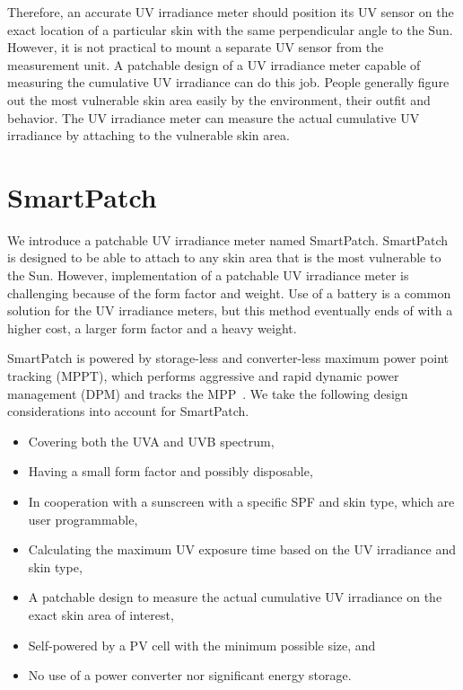 \documentclass[journal]{IEEEtran}
\begin{document}
Therefore, an accurate UV irradiance meter should position its UV sensor on the exact location of a particular skin with the same perpendicular angle to the Sun. 
However, it is not practical to mount a separate UV sensor from the measurement unit. 
A patchable design of a UV irradiance meter capable of measuring the cumulative UV irradiance can do this job. 
People generally figure out the most vulnerable skin area easily by the environment, their outfit and behavior. 
The UV irradiance meter can measure the actual cumulative UV irradiance by attaching to the vulnerable skin area. 

\section{SmartPatch}

We introduce a patchable UV irradiance meter named SmartPatch. 
SmartPatch is designed to be able to attach to any skin area that is the most vulnerable to the Sun. 
However, implementation of a patchable UV irradiance meter is challenging because of the form factor and weight. 
Use of a battery is a common solution for the UV irradiance meters, but this method eventually ends of with a higher cost, a larger form factor and a heavy weight.

SmartPatch is powered by storage-less and converter-less maximum power point tracking (MPPT), which performs aggressive and rapid dynamic power management (DPM) and tracks the MPP~\cite{Wang:ASPDAC14}. 
We take the following design considerations into account for SmartPatch.

\begin{itemize}
\item Covering both the UVA and UVB spectrum,
\item Having a small form factor and possibly disposable,
\item In cooperation with a sunscreen with a specific SPF and skin type, which are user programmable,
\item Calculating the maximum UV exposure time based on the UV irradiance and skin type,
\item A patchable design to measure the actual cumulative UV irradiance on the exact skin area of interest,
\item Self-powered by a PV cell with the minimum possible size, and
\item No use of a power converter nor significant energy storage.
\end{itemize}
\end{document}
